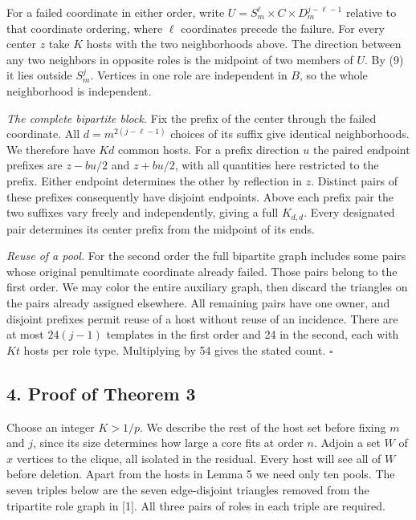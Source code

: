 \documentclass[english,11pt,a4paper]{article}
\begin{document}
For a failed coordinate in either order, write \(U=S_m^\ell\times C\times D_m^{j-\ell-1}\) relative to that coordinate ordering, where \(\ell\) coordinates precede the failure. For every center \(z\) take \(K\) hosts with the two neighborhoods above. The direction between any two neighbors in opposite roles is the midpoint of two members of \(U\). By (9) it lies outside \(S_m^j\). Vertices in one role are independent in \(B\), so the whole neighborhood is independent.

\emph{The complete bipartite block.} Fix the prefix of the center through the failed coordinate. All \(d=m^{2(j-\ell-1)}\) choices of its suffix give identical neighborhoods. We therefore have \(Kd\) common hosts. For a prefix direction \(u\) the paired endpoint prefixes are \(z-bu/2\) and \(z+bu/2\), with all quantities here restricted to the prefix. Either endpoint determines the other by reflection in \(z\). Distinct pairs of these prefixes consequently have disjoint endpoints. Above each prefix pair the two suffixes vary freely and independently, giving a full \(K_{d,d}\). Every designated pair determines its center prefix from the midpoint of its ends.

\emph{Reuse of a pool.} For the second order the full bipartite graph includes some pairs whose original penultimate coordinate already failed. Those pairs belong to the first order. We may color the entire auxiliary graph, then discard the triangles on the pairs already assigned elsewhere. All remaining pairs have one owner, and disjoint prefixes permit reuse of a host without reuse of an incidence. There are at most \(24(j-1)\) templates in the first order and 24 in the second, each with \(Kt\) hosts per role type. Multiplying by 54 gives the stated count. \(\square\)

\subsection{4. Proof of Theorem 3}\label{proof-of-theorem-3}

Choose an integer \(K>1/p\). We describe the rest of the host set before fixing \(m\) and \(j\), since its size determines how large a core fits at order \(n\). Adjoin a set \(W\) of \(x\) vertices to the clique, all isolated in the residual. Every host will see all of \(W\) before deletion. Apart from the hosts in Lemma 5 we need only ten pools. The seven triples below are the seven edge-disjoint triangles removed from the tripartite role graph in {[}1{]}. All three pairs of roles in each triple are required.
\end{document}
